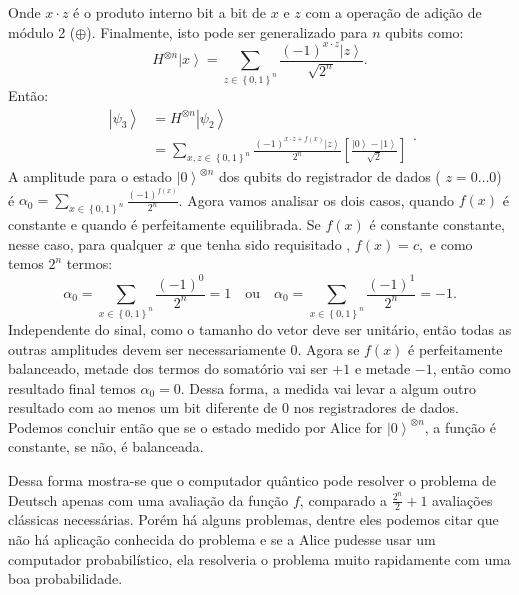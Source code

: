 Onde $x\cdot z$ é o produto interno bit a bit de $x$ e $z$ com a operação de adição de módulo 2 ($\oplus$). Finalmente, isto pode ser generalizado para $n$ qubits como:
\begin{equation}
H^{\otimes n}\left|x\right\rangle = \sum_{z\in\left\{ 0,1\right\} ^{n}}\frac{\left(-1\right)^{x\cdot z}\left|z\right\rangle }{\sqrt{2^{n}}}
. \end{equation}
Então:
\begin{equation}
\begin{split}
\left|\psi_{3}\right\rangle & =H^{\otimes n}\left|\psi_{2}\right\rangle  \\
& =\sum_{x,z\in\left\{ 0,1\right\} ^{n}}\frac{\left(-1\right)^{x\cdot z+f\left(x\right)}\left|z\right\rangle }{2^{n}}\left[\frac{\left|0\right\rangle -\left|1\right\rangle }{\sqrt{2}}\right]
\end{split}
. \end{equation}
A amplitude para o estado  $\left|0\right\rangle ^{\otimes n}$ dos qubits do registrador de dados ( $z=0\dots0$) é  $ \alpha_{0}=\sum_{x\in\left\{ 0,1\right\} ^{n}}\frac{\left(-1\right)^{f\left(x\right)}}{2^{n}}$. Agora vamos analisar os dois casos, quando $f\left(x\right)$ é constante e quando é perfeitamente equilibrada.  Se $f\left(x\right)$  é constante constante, nesse caso, para qualquer $x$ que tenha sido requisitado , $f\left(x\right)=c,$ e como temos $2^{n}$ termos:
\begin{equation}
\alpha_{0}=\sum_{x\in\left\{ 0,1\right\} ^{n}}\frac{\left(-1\right)^{0}}{2^{n}}=1\quad\text{ou}\quad\alpha_{0}=\sum_{x\in\left\{ 0,1\right\} ^{n}}\frac{\left(-1\right)^{1}}{2^{n}}=-1
. \end{equation}
Independente do sinal, como o tamanho do vetor deve ser unitário, então todas as outras amplitudes devem ser necessariamente $0$. Agora se $f\left(x\right)$ é perfeitamente balanceado, metade dos termos do somatório vai ser $+1$ e metade $-1$, então como resultado final temos  $\alpha_{0}=0$. Dessa forma, a medida vai levar a algum outro resultado com ao menos um bit diferente de $0$ nos registradores de dados. Podemos concluir então que se o estado medido por Alice for $\left|0\right\rangle ^{\otimes n}$,  a função é constante, se não, é balanceada.

Dessa forma mostra-se que o computador quântico pode resolver o problema de Deutsch apenas com uma avaliação da função $f$, comparado a $\frac{2^{n}}{2}+1$ avaliações clássicas necessárias.  Porém há alguns problemas, dentre eles podemos citar que não há aplicação conhecida do problema e se a Alice pudesse usar um computador probabilístico, ela resolveria o problema muito rapidamente com uma boa probabilidade.

